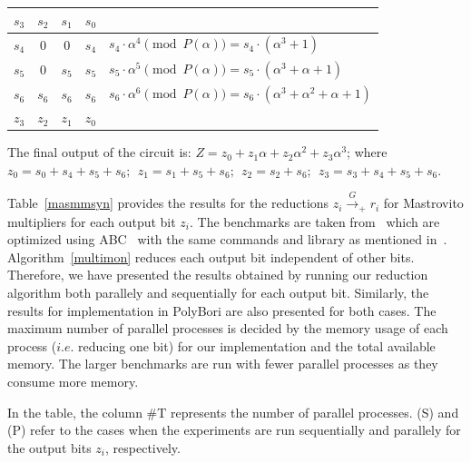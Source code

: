 \begin{Example}
{\vspace{0.05in}

{\small
{\begin{tabular}{|c c c c | l }
  $s_3$   &$s_2$    &$s_1$   &$s_0$   &   \\
 \hline
 $s_4$    &$0$    &$0$   &$s_4$   &$s_4\cdot \alpha^4 \pmod{P(\alpha)} = s_4 \cdot (\alpha^3 + 1)$\\
 $s_5$    &$0$    &$s_5$   &$s_5$     &$s_5\cdot \alpha^5 \pmod{P(\alpha)} = s_5\cdot (\alpha^3+ \alpha + 1)$\\
 $s_6$    &$s_6$    &$s_6$   &$s_6$     &$s_6\cdot \alpha^6 \pmod{ P(\alpha)} = s_6\cdot( \alpha^3 + \alpha^2 + \alpha + 1)$\\
 \hline
 $z_3$    &$z_2$    &$z_1$   &$z_0$   &
 \end{tabular}\par}
}

\vspace{0.05in}

The final output of the circuit is: $Z = z_0 + z_1 \alpha + z_2
\alpha^2 + z_3 \alpha^3$; where  $z_0=s_0+s_4+s_5+s_6; ~~z_1=s_1+s_5+s_6;
~~z_2=s_2+s_6; ~~z_3=s_3+s_4+s_5+s_6$. 
}
\end{Example}

\par Table~\ref{masmmsyn} provides the results for the reductions $z_i \xrightarrow{G}_+ r_i$ for Mastrovito multipliers for each output bit $z_i$.
The benchmarks are taken from~\cite{lv:tcad2013} which are optimized using ABC~\cite{ABCtool} with the same commands and library as mentioned in~\cite{cunxi:aspdac17}. Algorithm~\ref{multimon} reduces each output bit independent of other bits. Therefore, we have presented the results obtained by running our reduction algorithm both parallely and sequentially for each output bit. Similarly, the results for implementation in PolyBori are also presented for both cases. The maximum number of parallel processes is decided by the memory usage of each process ($i.e.$ reducing one bit) for our implementation and the total available memory. The larger benchmarks are run with fewer parallel processes as they consume more memory.
\par In the table, the column \#T represents the number of parallel processes. (S) and (P) refer to the cases when the experiments are run sequentially and parallely for the output bits $z_i$, respectively. 

